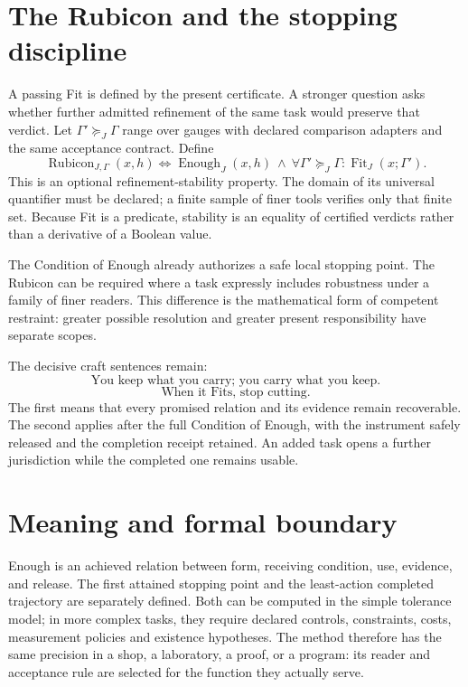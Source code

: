 \documentclass[11pt,letterpaper]{article}
\theoremstyle{definition}\newtheorem{definition}{Definition}
\newcommand{\Fit}{\operatorname{Fit}}
\newcommand{\Enough}{\operatorname{Enough}}
\begin{document}
\section{The Rubicon and the stopping discipline}
A passing Fit is defined by the present certificate. A stronger question asks whether further admitted refinement of the same task would preserve that verdict. Let $\Gamma'\succeq_J\Gamma$ range over gauges with declared comparison adapters and the same acceptance contract. Define
\begin{equation}\label{eq:rubicon}
\boxed{\operatorname{Rubicon}_{J,\Gamma}(x,h)\iff
\Enough_J(x,h)\ \land\
\forall\Gamma'\succeq_J\Gamma:\Fit_J(x;\Gamma').}
\end{equation}
This is an optional refinement-stability property. The domain of its universal quantifier must be declared; a finite sample of finer tools verifies only that finite set. Because Fit is a predicate, stability is an equality of certified verdicts rather than a derivative of a Boolean value.

The Condition of Enough already authorizes a safe local stopping point. The Rubicon can be required where a task expressly includes robustness under a family of finer readers. This difference is the mathematical form of competent restraint: greater possible resolution and greater present responsibility have separate scopes.

The decisive craft sentences remain:
\begin{equation}\label{eq:carry}
\boxed{\text{You keep what you carry; you carry what you keep.}}
\end{equation}
\begin{equation}\label{eq:blade}
\boxed{\text{When it Fits, stop cutting.}}
\end{equation}
The first means that every promised relation and its evidence remain recoverable. The second applies after the full Condition of Enough, with the instrument safely released and the completion receipt retained. An added task opens a further jurisdiction while the completed one remains usable.

\section{Meaning and formal boundary}
Enough is an achieved relation between form, receiving condition, use, evidence, and release. The first attained stopping point and the least-action completed trajectory are separately defined. Both can be computed in the simple tolerance model; in more complex tasks, they require declared controls, constraints, costs, measurement policies and existence hypotheses. The method therefore has the same precision in a shop, a laboratory, a proof, or a program: its reader and acceptance rule are selected for the function they actually serve.
\end{document}
